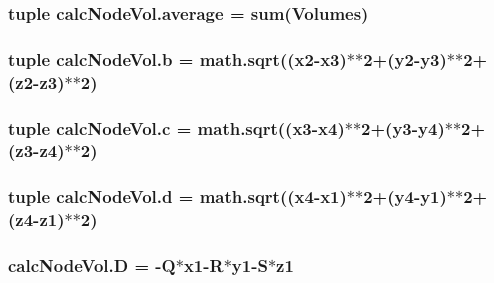 \subsubsection[{average}]{\setlength{\rightskip}{0pt plus 5cm}tuple calc\+Node\+Vol.\+average = sum({\bf Volumes})}\label{namespacecalcNodeVol_a80842dbecc8a3378b52f03512ae1be5e}
\hypertarget{namespacecalcNodeVol_a58cf10ff9626f4143af170b77b8bcd72}{}
\subsubsection[{b}]{\setlength{\rightskip}{0pt plus 5cm}tuple calc\+Node\+Vol.\+b = math.\+sqrt(({\bf x2}-\/{\bf x3})$\ast$$\ast$2+({\bf y2}-\/{\bf y3})$\ast$$\ast$2+({\bf z2}-\/{\bf z3})$\ast$$\ast$2)}\label{namespacecalcNodeVol_a58cf10ff9626f4143af170b77b8bcd72}
\hypertarget{namespacecalcNodeVol_a94b9298311e3f73abc41c194f95ec0f5}{}
\subsubsection[{c}]{\setlength{\rightskip}{0pt plus 5cm}tuple calc\+Node\+Vol.\+c = math.\+sqrt(({\bf x3}-\/{\bf x4})$\ast$$\ast$2+({\bf y3}-\/{\bf y4})$\ast$$\ast$2+({\bf z3}-\/{\bf z4})$\ast$$\ast$2)}\label{namespacecalcNodeVol_a94b9298311e3f73abc41c194f95ec0f5}
\hypertarget{namespacecalcNodeVol_ab1f29bf4079b9e99c041b57c6aa1a3d1}{}
\subsubsection[{d}]{\setlength{\rightskip}{0pt plus 5cm}tuple calc\+Node\+Vol.\+d = math.\+sqrt(({\bf x4}-\/{\bf x1})$\ast$$\ast$2+({\bf y4}-\/{\bf y1})$\ast$$\ast$2+({\bf z4}-\/{\bf z1})$\ast$$\ast$2)}\label{namespacecalcNodeVol_ab1f29bf4079b9e99c041b57c6aa1a3d1}
\hypertarget{namespacecalcNodeVol_ae925d7770927301010ae227a1871073b}{}
\subsubsection[{D}]{\setlength{\rightskip}{0pt plus 5cm}calc\+Node\+Vol.\+D = -\/Q$\ast${\bf x1}-\/R$\ast${\bf y1}-\/S$\ast${\bf z1}}\label{namespacecalcNodeVol_ae925d7770927301010ae227a1871073b}
\hypertarget{namespacecalcNodeVol_acb063a8c5b2a22cd96a1962924082680}{}

